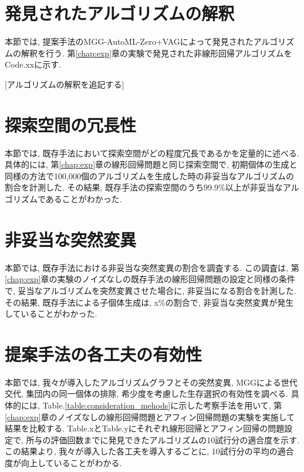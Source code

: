 \documentclass[11pt,oneside,openany,report]{jsbook}
\begin{document}
\section{発見されたアルゴリズムの解釈}

本節では, 提案手法のMGG-AutoML-Zero+VAGによって発見されたアルゴリズムの解釈を行う. 第\ref{chap:exp}章の実験で発見された非線形回帰アルゴリズムをCode.xxに示す.

[アルゴリズムの解釈を追記する]

\section{探索空間の冗長性} \label{sec:consideration:redundancy}

本節では, 既存手法において探索空間がどの程度冗長であるかを定量的に述べる. 具体的には, 第\ref{chap:exp}章の線形回帰問題と同じ探索空間で, 初期個体の生成と同様の方法で100,000個のアルゴリズムを生成した時の非妥当なアルゴリズムの割合を計測した. その結果, 既存手法の探索空間のうち99.9\%以上が非妥当なアルゴリズムであることがわかった.

\section{非妥当な突然変異} \label{sec:consideration:invalid}

本節では, 既存手法における非妥当な突然変異の割合を調査する. この調査は, 第\ref{chap:exp}章の実験のノイズなしの既存手法の線形回帰問題の設定と同様の条件で, 妥当なアルゴリズムを突然変異させた場合に, 非妥当になる割合を計測した. その結果, 既存手法による子個体生成は, x\%の割合で, 非妥当な突然変異が発生していることがわかった.

\section{提案手法の各工夫の有効性}
本節では, 我々が導入したアルゴリズムグラフとその突然変異, MGGによる世代交代, 集団内の同一個体の排除, 希少度を考慮した生存選択の有効性を調べる. 具体的には, Table.\ref{table:consideration_mehods}に示した考察手法を用いて, 第\ref{chap:exp}章のノイズなしの線形回帰問題とアフィン回帰問題の実験を実施して結果を比較する. Table.xとTable.yにそれぞれ線形回帰とアフィン回帰の問題設定で, 所与の評価回数までに発見できたアルゴリズムの10試行分の適合度を示す. この結果より, 我々が導入した各工夫を導入するごとに, 10試行分の平均の適合度が向上していることがわかる.
\end{document}
